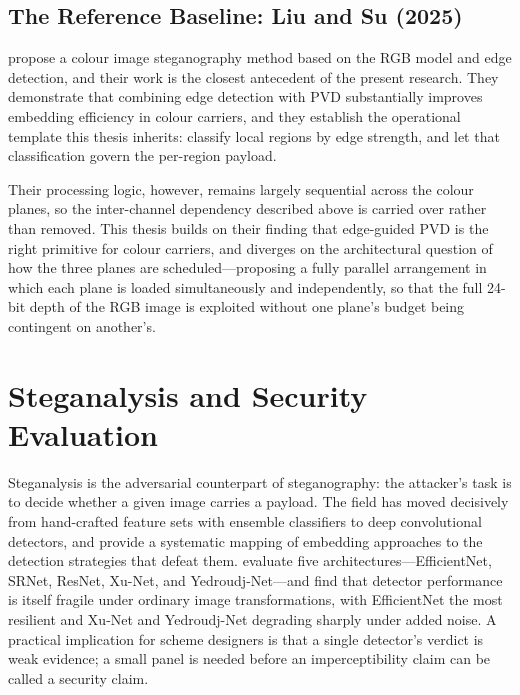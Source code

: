 \subsection{The Reference Baseline: Liu and Su (2025)}
\citet{liu2025color} propose a colour image steganography method based on the RGB model and edge detection, and their work is the closest antecedent of the present research. They demonstrate that combining edge detection with PVD substantially improves embedding efficiency in colour carriers, and they establish the operational template this thesis inherits: classify local regions by edge strength, and let that classification govern the per-region payload.

Their processing logic, however, remains largely sequential across the colour planes, so the inter-channel dependency described above is carried over rather than removed. This thesis builds on their finding that edge-guided PVD is the right primitive for colour carriers, and diverges on the architectural question of how the three planes are scheduled---proposing a fully parallel arrangement in which each plane is loaded simultaneously and independently, so that the full 24-bit depth of the RGB image is exploited without one plane's budget being contingent on another's.

\section{Steganalysis and Security Evaluation} \label{sec:ch2-security}
Steganalysis is the adversarial counterpart of steganography: the attacker's task is to decide whether a given image carries a payload. The field has moved decisively from hand-crafted feature sets with ensemble classifiers to deep convolutional detectors, and \citet{kombrink2025survey} provide a systematic mapping of embedding approaches to the detection strategies that defeat them. \citet{alrusaini2025robustness} evaluate five architectures---EfficientNet, SRNet, ResNet, Xu-Net, and Yedroudj-Net---and find that detector performance is itself fragile under ordinary image transformations, with EfficientNet the most resilient and Xu-Net and Yedroudj-Net degrading sharply under added noise. A practical implication for scheme designers is that a single detector's verdict is weak evidence; a small panel is needed before an imperceptibility claim can be called a security claim.

